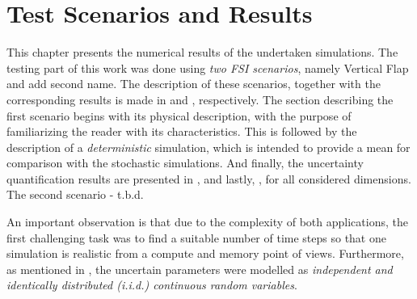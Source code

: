 \chapter{Test Scenarios and Results}
\label{chapter:Test Scenarios and Results}
	
	This chapter presents the numerical results of the undertaken simulations. The testing part of this work was done using \emph{two FSI scenarios}, namely {Vertical Flap} and {add second name}. The description of these scenarios, together with the corresponding results is made in  and , respectively. The section describing the first scenario begins with its physical description, with the purpose of familiarizing the reader with its characteristics. This is followed by the description of a \emph{deterministic} simulation, which is intended to provide a mean for comparison with the stochastic simulations. And finally, the uncertainty quantification results are presented in ,  and lastly, , for all considered dimensions. The second scenario - t.b.d.
	
	An important observation is that due to the complexity of both applications, the first challenging task was to find a suitable number of time steps so that one simulation is realistic from a compute and memory point of views. Furthermore, as mentioned in , the uncertain parameters were modelled as \emph{independent and identically distributed (i.i.d.) continuous random variables}.
